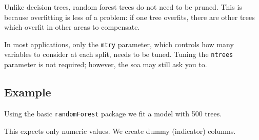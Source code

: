 \documentclass[openany]{book}
\newenvironment{Shaded}{\begin{snugshade}}{\end{snugshade}}
\newcommand{\DataTypeTok}[1]{\textcolor[rgb]{0.13,0.29,0.53}{#1}}
\newcommand{\DecValTok}[1]{\textcolor[rgb]{0.00,0.00,0.81}{#1}}
\newcommand{\KeywordTok}[1]{\textcolor[rgb]{0.13,0.29,0.53}{\textbf{#1}}}
\newcommand{\NormalTok}[1]{#1}
\newcommand{\OperatorTok}[1]{\textcolor[rgb]{0.81,0.36,0.00}{\textbf{#1}}}
\newcommand{\StringTok}[1]{\textcolor[rgb]{0.31,0.60,0.02}{#1}}
\begin{document}
Unlike decision trees, random forest trees do not need to be pruned. This is because overfitting is less of a problem: if one tree overfits, there are other trees which overfit in other areas to compensate.

In most applications, only the \texttt{mtry} parameter, which controls how many variables to consider at each split, needs to be tuned. Tuning the \texttt{ntrees} parameter is not required; however, the soa may still ask you to.

\hypertarget{example-3}{%
\subsection{Example}\label{example-3}}

Using the basic \texttt{randomForest} package we fit a model with 500 trees.

This expects only numeric values. We create dummy (indicator) columns.

\begin{Shaded}
\end{Shaded}
\end{document}
